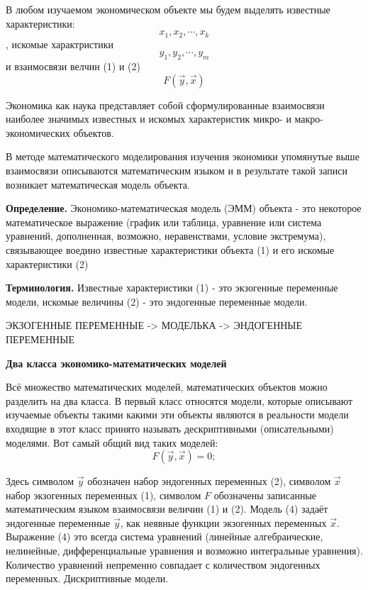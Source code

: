 \documentclass[12pt,a4paper]{article}
\begin{document}
В любом изучаемом экономическом объекте мы будем выделять известные характеристики:
\begin{equation}
x_1, x_2, \cdots, x_k
\end{equation}
, искомые характристики 
\begin{equation}
y_1, y_2, \cdots, y_m
\end{equation}
и взаимосвязи велчин (1) и (2)
\begin{equation}
 F(\vec{y}, \vec{x})
 \end{equation}

Экономика как наука представляет собой сформулированные взаимосвязи наиболее значимых известных и искомых характеристик микро- и макро- экономических объектов.

В методе математического моделирования изучения экономики упомянутые выше взаимосвязи описываются математическим языком и в результате такой записи возникает математическая модель объекта. 

\textbf{Определение.} Экономико-математическая модель (ЭММ) объекта - это некоторое математическое выражение (график или таблица, уравнение или система уравнений, дополненная, возможно, неравенствами, условие экстремума), связывающее воедино известные характеристики объекта (1) и его искомые характеристики (2)

\textbf{Терминология.} Известные характеристики (1) - это экзогенные переменные модели, искомые величины (2) - это эндогенные переменные модели. \\
\begin{center}
ЭКЗОГЕННЫЕ ПЕРЕМЕННЫЕ -> МОДЕЛЬКА -> ЭНДОГЕННЫЕ ПЕРЕМЕННЫЕ
\end{center}

\begin{center}
\textbf{Два класса экономико-математических моделей}
\end{center}

Всё множество математических моделей, математических объектов можно разделить на два класса. В первый класс относятся модели, которые описывают изучаемые объекты такими какими эти объекты являются в реальности модели входящие в этот класс принято называть дескриптивными (описательными) моделями. Вот самый общий вид таких моделей:
\begin{equation}
F(\vec{y}, \vec{x}) = 0;
\end{equation}

Здесь символом $\vec{y}$ обозначен набор эндогенных переменных (2), символом $\vec{x}$ набор экзогенных переменных (1), символом $F$ обозначены записанные математическим языком взаимосвязи величин (1) и (2). Модель (4) задаёт эндогенные переменные $\vec{y}$, как неявные функции экзогенных переменных $\vec{x}$. Выражение (4) это всегда система уравнений (линейные алгебраические, нелинейные, дифференциальные уравнения и возможно интегральные уравнения). Количество уравнений непременно совпадает с количеством эндогенных переменных. Дискриптивные модели.
\end{document}
